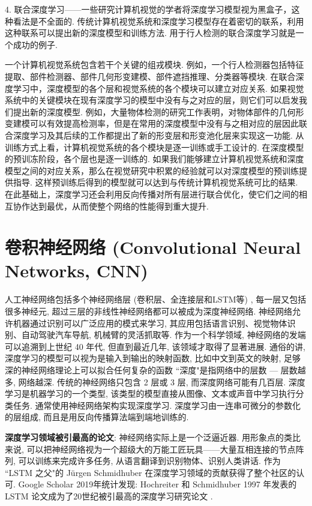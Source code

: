 4. 联合深度学习——一些研究计算机视觉的学者将深度学习模型视为黑盒子，这种看法是不全面的. 传统计算机视觉系统和深度学习模型存在着密切的联系，利用这种联系可以提出新的深度模型和训练方法. 用于行人检测的联合深度学习就是一个成功的例子.
\begin{example}
一个计算机视觉系统包含若干个关键的组戎模块. 例如，一个行人检测器包括特征提取、部件检测器、部件几何形变建模、部件遮挡推理、分类器等模块. 在联合深度学习中，深度模型的各个层和视觉系统的各个模块可以建立对应关系. 如果视觉系统中的关键模块在现有深度学习的模型中没有与之对应的层，则它们可以启发我们提出新的深度模型. 例如，大量物体检测的研究工作表明，对物体部件的几何形变建模可以有效提高检测率，但是在常用的深度模型中没有与之相对应的层因此联合深度学习及其后续的工作都提出了新的形变层和形变池化层来实现这一功能.
从训练方式上看，计算机视觉系统的各个模块是逐一训练或手工设计的. 在深度模型的预训冻阶段，各个层也是逐一训练的. 如果我们能够建立计算机视觉系统和深度模型之间的对应关系，那么在视觉研究中积累的经验就可以对深度模型的预训练提供指导. 这样预训练后得到的模型就可以达到与传统计算机视觉系统可比的结果. 在此基础上，深度学习还会利用反向传播对所有层进行联合优化，使它们之间的相互协作达到最优，从而使整个网络的性能得到重大提升.
\end{example}
\section{卷积神经网络 (Convolutional Neural Networks, CNN)}
人工神经网络包括多个神经网络层 (卷积层、全连接层和LSTM等) , 每一层又包括很多神经元, 超过三层的非线性神经网络都可以被成为深度神经网络.
神经网络允许机器通过识别可以广泛应用的模式来学习, 其应用包括语言识别、视觉物体识别、自动驾驶汽车导航, 机械臂的灵活抓取等.
作为一个科学领域, 神经网络的发端可以追溯到上世纪 40 年代, 但直到最近几年, 该领域才取得了显著进展.
通俗的讲, 深度学习的模型可以视为是输入到输出的映射函数, 比如中文到英文的映射, 足够深的神经网络理论上可以拟合任何复杂的函数
 ``深度"是指网络中的层数 — 层数越多, 网络越深. 传统的神经网络只包含 2 层或 3 层, 而深度网络可能有几百层.
深度学习是机器学习的一个类型, 该类型的模型直接从图像、文本或声音中学习执行分类任务. 通常使用神经网络架构实现深度学习.
深度学习由一连串可微分的参数化的层组成, 而且是用反向传播算法端到端地训练的.
\begin{remark}
\textbf{深度学习领域被引最高的论文}:
神经网络实际上是一个泛逼近器. 用形象点的类比来说, 可以把神经网络视为一个超级大的万能工匠玩具——大量互相连接的节点阵列, 可以训练来完成许多任务, 从语言翻译到识别物体、识别人类讲话.
作为 ``LSTM 之父"的 Jürgen Schmidhuber 在深度学习领域的贡献获得了整个社区的认可.
Google Scholar 2019年统计发现: Hochreiter 和 Schmidhuber 1997 年发表的 LSTM 论文成为了20世纪被引最高的深度学习研究论文 \cite{HochreiterNC1997}.
\end{remark}

